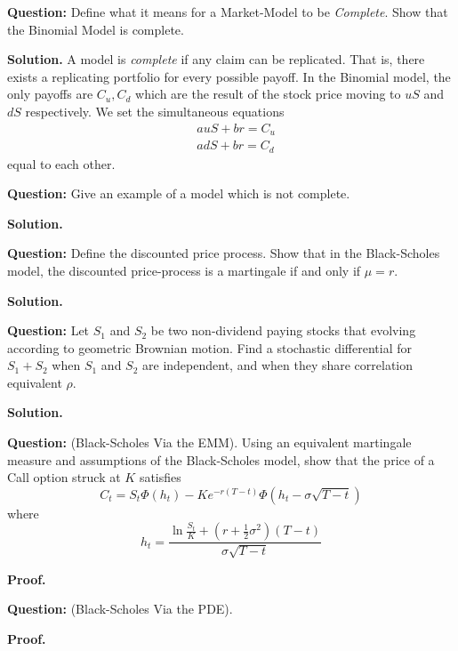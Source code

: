 \documentclass{article}
\begin{document}
\begin{tcolorbox}[colframe=black,colback=gray!5,boxrule=0.5pt]
\textbf{Question:} Define what it means for a Market-Model to be \textit{Complete}. Show that the Binomial Model is complete. 
\end{tcolorbox}
\textbf{Solution.} A model is \textit{complete} if any claim can be replicated. That is, there exists a replicating portfolio for every possible payoff. In the Binomial model, the only payoffs are $C_u, C_d$ which are the result of the stock price moving to $uS$ and $dS$ respectively. We set the simultaneous equations 
\begin{align*}
    & auS + br = C_u \\
    & adS + br = C_d
\end{align*}
equal to each other.


\begin{tcolorbox}[colframe=black,colback=gray!5,boxrule=0.5pt]
\textbf{Question:} Give an example of a model which is not complete. 
\end{tcolorbox}
\textbf{Solution.}

\begin{tcolorbox}[colframe=black,colback=gray!5,boxrule=0.5pt]
\textbf{Question:} Define the discounted price process. Show that in the Black-Scholes model, the discounted price-process is a martingale if and only if $\mu = r$.
\end{tcolorbox}
\textbf{Solution.}


\begin{tcolorbox}[colframe=black,colback=gray!5,boxrule=0.5pt]
\textbf{Question:} Let $S_1$ and $S_2$ be two non-dividend paying stocks that evolving according to geometric Brownian motion. Find a stochastic differential for $S_1 + S_2$ when $S_1$ and $S_2$ are independent, and when they share correlation equivalent $\rho$.  \cite{Hull}
\end{tcolorbox}
\textbf{Solution.}

\begin{tcolorbox}[colframe=black,colback=gray!5,boxrule=0.5pt]
\textbf{Question:} (Black-Scholes Via the EMM). Using an equivalent martingale measure and assumptions of the Black-Scholes model, show that the price of a Call option struck at $K$ satisfies
$$C_t = S_t\Phi(h_t) - Ke^{-r(T-t)}\Phi(h_t-\sigma\sqrt{T-t})$$
where 
$$h_t = \frac{\ln\frac{S_t}{K} + (r+\frac{1}{2}\sigma^2)(T-t)}{\sigma\sqrt{T-t}}$$
\end{tcolorbox}
\textbf{Proof.}

\begin{tcolorbox}[colframe=black,colback=gray!5,boxrule=0.5pt]
\textbf{Question:} (Black-Scholes Via the PDE). 
\end{tcolorbox}
\textbf{Proof.}
\end{document}
